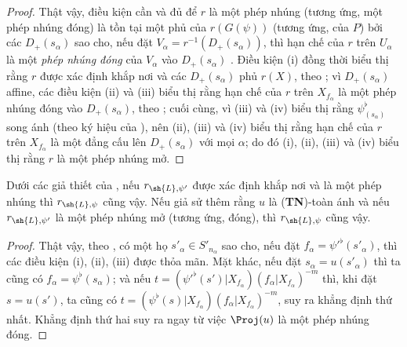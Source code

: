 \documentclass[oneside,10pt]{amsart}
\let\EGAOriginalLabel\label
\renewcommand{\label}[1]{\phantomsection\EGAOriginalLabel{#1}}
\begin{document}
\begin{proof}
Thật vậy, điều kiện cần và đủ để $r$ là một phép nhúng (tương ứng, một phép nhúng đóng) là tồn tại một phủ của $r(G(\psi))$ (tương ứng, của $P$) bởi các $D_+(s_\alpha)$ sao cho, nếu đặt $V_\alpha=r^{-1}(D_+(s_\alpha))$, thì hạn chế của $r$ trên $U_\alpha$ là một \emph{phép nhúng đóng} của $V_\alpha$ vào $D_+(s_\alpha)$ .
Điều kiện (i) đồng thời biểu thị rằng $r$ được xác định khắp nơi và các $D_+(s_\alpha)$ phủ $r(X)$, theo ;
vì $D_+(s_\alpha)$ affine, các điều kiện (ii) và (iii) biểu thị rằng hạn chế của $r$ trên $X_{f_\alpha}$ là một phép nhúng đóng vào $D_+(s_\alpha)$, theo ;
cuối cùng, vì (iii) và (iv) biểu thị rằng $\psi_{(s_\alpha)}^\flat$ song ánh (theo ký hiệu của ), nên (ii), (iii) và (iv) biểu thị rằng hạn chế của $r$ trên $X_{f_\alpha}$ là một đẳng cấu lên $D_+(s_\alpha)$ với mọi $\alpha$;
do đó (i), (ii), (iii) và (iv) biểu thị rằng $r$ là một phép nhúng mở.
\end{proof}

\begin{corollary}[3.8.3]
\label{II.3.8.3}
Dưới các giả thiết của , nếu $r_{\sh{L},\psi'}$ được xác định khắp nơi và là một phép nhúng thì $r_{\sh{L},\psi}$ cũng vậy.
Nếu giả sử thêm rằng $u$ là (\textbf{TN})-toàn ánh và nếu $r_{\sh{L},\psi'}$ là một phép nhúng mở (tương ứng, đóng), thì $r_{\sh{L},\psi}$ cũng vậy.
\end{corollary}

\begin{proof}
Thật vậy, theo , có một họ $s'_\alpha\in S'_{n_\alpha}$ sao cho, nếu đặt $f_\alpha=\psi'^\flat(s'_\alpha)$, thì các điều kiện (i), (ii), (iii) được thỏa mãn.
Mặt khác, nếu đặt $s_\alpha=u(s'_\alpha)$ thì ta cũng có $f_\alpha=\psi^\flat(s_\alpha)$; và nếu $t=(\psi'^\flat(s')|X_{f_\alpha})(f_\alpha|X_{f_\alpha})^{-m}$ thì, khi đặt $s=u(s')$, ta cũng có $t=(\psi^\flat(s)|X_{f_\alpha})(f_\alpha|X_{f_\alpha})^{-m}$, suy ra khẳng định thứ nhất.
Khẳng định thứ hai suy ra ngay từ việc $\Proj(u)$ là một phép nhúng đóng.
\end{proof}
\end{document}
